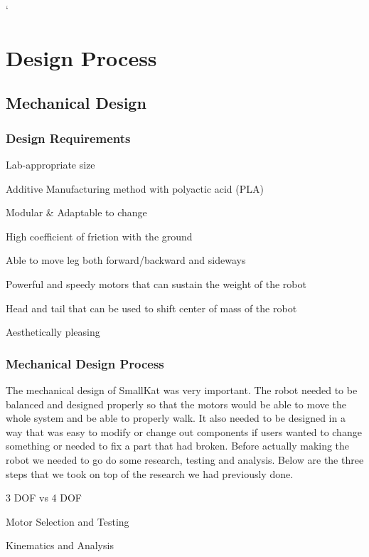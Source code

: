 `\section{Design Process} %


    \subsection{Mechanical Design} 

        \subsubsection{Design Requirements}
            \begin{Deliverables}
                \item Lab-appropriate size
                \item Additive Manufacturing method with polyactic acid (PLA)
                \item Modular \& Adaptable to change
                \item High coefficient of friction with the ground
                \item Able to move leg both forward/backward and sideways
                \item Powerful and speedy motors that can sustain the weight of the robot
                \item Head and tail that can be used to shift center of mass of the robot
                \item Aesthetically pleasing
            \end{Deliverables}
            
         \subsubsection{Mechanical Design Process}
            The mechanical design of SmallKat was very important. The robot needed to be balanced and designed properly so that the motors would be able to move the whole system and be able to properly walk. It also needed to be designed in a way that was easy to modify or change out components if users wanted to change something or needed to fix a part that had broken. Before actually making the robot we needed to go do some research, testing and analysis. Below are the three steps that we took on top of the research we had previously done. 
             \begin{Deliverables}
                \item 3 DOF vs 4 DOF
                \item Motor Selection and Testing
                \item Kinematics and Analysis
            \end{Deliverables}
      

